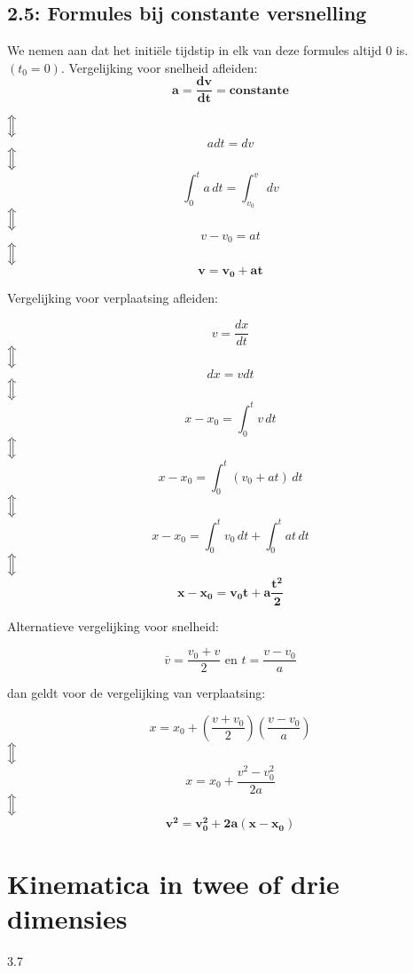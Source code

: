 \documentclass[12pt,a4paper]{article}
\newcommand{\Luda}{\Big\Updownarrow}
\begin{document}
    \subsection{2.5: Formules bij constante versnelling}
    We nemen aan dat het initiële tijdstip in elk van deze formules altijd 0 is. \((t_{0} = 0)\).
    Vergelijking voor snelheid afleiden:
    \[\mathbf{a = \frac{dv}{dt} = constante}\]
    \begin{center}
	    $\Luda$ \[a dt = dv\]
	    $\Luda$ \[\int_{0}^{t} a \, dt = \int_{v_0}^{v} \,dv\]
	    $\Luda$\[v - v_0 = at\]
	    $\Luda$\[\mathbf{v = v_0 + at}\]
    \end{center}
\newpage
    Vergelijking voor verplaatsing afleiden:
    \begin{center}
               \[v = \frac{dx}{dt}\]
	    $\Luda$\[dx = v dt\]
	    $\Luda$\[x - x_0 = \int_{0}^{t} v \, dt\]
	    $\Luda$\[x - x_0 = \int_{0}^{t} (v_0 + at) \, dt\]
	    $\Luda$\[x - x_0 = \int_{0}^{t} v_0 \, dt + \int_{0}^{t} at \, dt\]
	    $\Luda$\[\mathbf{x - x_0 = v_0t + a\frac{t^2}{2}}\]
    \end{center}
    Alternatieve vergelijking voor snelheid:
    \begin{center}
    	\[\bar{v} = \frac{v_0 + v}{2} \text{ en } t = \frac{v - v_0}{a}\]
    \end{center}
    dan geldt voor de vergelijking van verplaatsing:
    \begin{center}
               \[x = x_0 + (\frac{v + v_0}{2})(\frac{v - v_0}{a})\]
	    $\Luda$\[x = x_0 + \frac{v^2 - v_0^2}{2a}\]
	    $\Luda$\[\mathbf{v^2 = v_0^2 + 2a(x - x_0)}\]
    \end{center}


    \section{Kinematica in twee of drie dimensies}
    3.7
\end{document}
